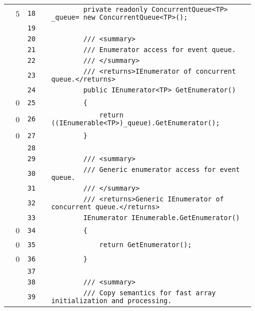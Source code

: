 \documentclass[a4paper,landscape,10pt]{article}
\begin{document}
\begin{longtable}[l]{lrrll}
\cellcolor{green} & 5 & \verb~18~ & & \verb~        private readonly ConcurrentQueue<TP> _queue= new ConcurrentQueue<TP>();~\\
\cellcolor{gray} &  & \verb~19~ & & \verb~~\\
\cellcolor{gray} &  & \verb~20~ & & \verb~        /// <summary>~\\
\cellcolor{gray} &  & \verb~21~ & & \verb~        /// Enumerator access for event queue.~\\
\cellcolor{gray} &  & \verb~22~ & & \verb~        /// </summary>~\\
\cellcolor{gray} &  & \verb~23~ & & \verb~        /// <returns>IEnumerator of concurrent queue.</returns>~\\
\cellcolor{gray} &  & \verb~24~ & & \verb~        public IEnumerator<TP> GetEnumerator()~\\
\cellcolor{red} & 0 & \verb~25~ & & \verb~        {~\\
\cellcolor{red} & 0 & \verb~26~ & & \verb~            return ((IEnumerable<TP>)_queue).GetEnumerator();~\\
\cellcolor{red} & 0 & \verb~27~ & & \verb~        }~\\
\cellcolor{gray} &  & \verb~28~ & & \verb~~\\
\cellcolor{gray} &  & \verb~29~ & & \verb~        /// <summary>~\\
\cellcolor{gray} &  & \verb~30~ & & \verb~        /// Generic enumerator access for event queue.~\\
\cellcolor{gray} &  & \verb~31~ & & \verb~        /// </summary>~\\
\cellcolor{gray} &  & \verb~32~ & & \verb~        /// <returns>Generic IEnumerator of concurrent queue.</returns>~\\
\cellcolor{gray} &  & \verb~33~ & & \verb~        IEnumerator IEnumerable.GetEnumerator()~\\
\cellcolor{red} & 0 & \verb~34~ & & \verb~        {~\\
\cellcolor{red} & 0 & \verb~35~ & & \verb~            return GetEnumerator();~\\
\cellcolor{red} & 0 & \verb~36~ & & \verb~        }~\\
\cellcolor{gray} &  & \verb~37~ & & \verb~~\\
\cellcolor{gray} &  & \verb~38~ & & \verb~        /// <summary>~\\
\cellcolor{gray} &  & \verb~39~ & & \verb~        /// Copy semantics for fast array initialization and processing.~\\

\end{longtable}
\end{document}
